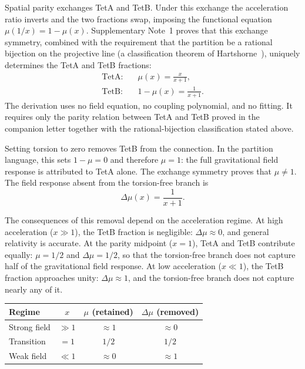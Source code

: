 \documentclass[twocolumn]{iopjournal}
\begin{document}
Spatial parity exchanges TetA and TetB. Under this exchange the
acceleration ratio inverts and the two fractions swap, imposing
the functional equation $\mu(1/x) = 1 - \mu(x)$. Supplementary
Note~1 proves that this exchange symmetry, combined with the
requirement that the partition be a rational bijection on the
projective line (a classification theorem of
Hartshorne~\cite{Hartshorne1977}), uniquely determines the TetA
and TetB fractions:
\begin{align}
  \text{TetA:} \quad & \mu(x) = \frac{x}{x + 1},
  \label{eq:mu} \\[4pt]
  \text{TetB:} \quad & 1 - \mu(x) = \frac{1}{x + 1}.
  \label{eq:tetb}
\end{align}
The derivation uses no field equation, no coupling polynomial,
and no fitting. It requires only the parity relation between
TetA and TetB proved in the companion letter together with the
rational-bijection classification stated above.

Setting torsion to zero removes TetB from the connection. In the
partition language, this sets $1 - \mu = 0$ and therefore
$\mu = 1$: the full gravitational field response is attributed to
TetA alone. The exchange symmetry proves that $\mu \neq 1$. The
field response absent from the torsion-free branch is
\begin{equation}
  \Delta\mu(x) = \frac{1}{x + 1}.
  \label{eq:delta_mu}
\end{equation}

The consequences of this removal depend on the acceleration
regime. At high acceleration ($x \gg 1$), the TetB fraction is
negligible: $\Delta\mu \approx 0$, and general relativity is
accurate. At the parity midpoint ($x = 1$), TetA and TetB
contribute equally: $\mu = 1/2$ and $\Delta\mu = 1/2$, so that
the torsion-free branch does not capture half of the
gravitational field
response. At low acceleration ($x \ll 1$), the TetB fraction
approaches unity: $\Delta\mu \approx 1$, and the torsion-free
branch does not capture nearly any of it.

\medskip
\begin{center}
\begin{tabular}{lccc}
\hline
Regime & $x$ & $\mu$ (retained) & $\Delta\mu$ (removed) \\
\hline
Strong field  & $\gg 1$ & $\approx 1$ & $\approx 0$ \\
Transition    & $= 1$   & $1/2$       & $1/2$ \\
Weak field    & $\ll 1$ & $\approx 0$ & $\approx 1$ \\
\hline
\end{tabular}
\end{center}
\end{document}
